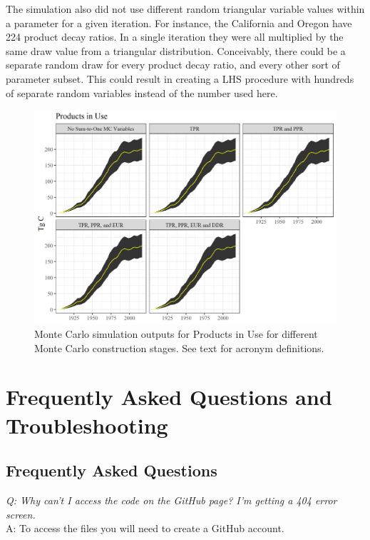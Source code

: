 \documentclass[
  openany]{book}
\begin{document}
The simulation also did not use different random triangular variable
values within a parameter for a given iteration. For instance, the
California and Oregon have 224 product decay ratios. In a single
iteration they were all multiplied by the same draw value from a
triangular distribution. Conceivably, there could be a separate random
draw for every product decay ratio, and every other sort of parameter
subset. This could result in creating a LHS procedure with hundreds of
separate random variables instead of the number used here.

\begin{figure}
\includegraphics[width=1\linewidth]{images/MC_tests4} \caption{Monte Carlo simulation outputs for Products in Use for different Monte Carlo construction stages.  See text for acronym definitions.}\label{fig:mc-tests4-fig}
\end{figure}

\hypertarget{ft}{%
\chapter{Frequently Asked Questions and Troubleshooting}\label{ft}}

\hypertarget{ft-faqs}{%
\section{Frequently Asked Questions}\label{ft-faqs}}

\emph{Q: Why can't I access the code on the GitHub page? I'm getting a
404 error screen.}\\
A: To access the files you will need to create a GitHub account.
\end{document}
